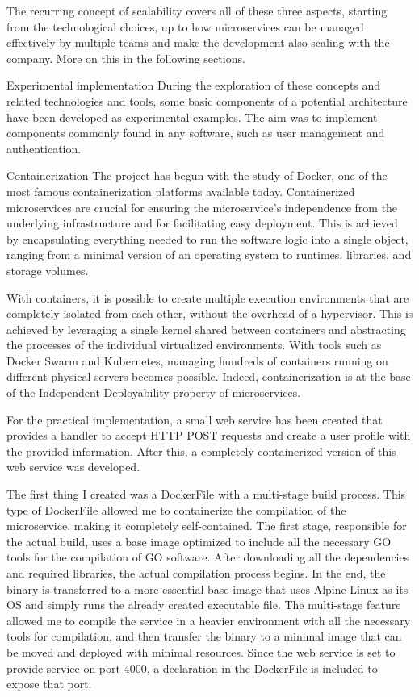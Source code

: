 \documentclass[sigplan,screen]{acmart}
\begin{document}
The recurring concept of scalability covers all of these three aspects, starting from the technological choices, up to how microservices can be managed effectively by multiple teams and make the development also scaling with the company. More on this in the following sections.

Experimental implementation
During the exploration of these concepts and related technologies and tools, some basic components of a potential architecture have been developed as experimental examples. The aim was to implement components commonly found in any software, such as user management and authentication.

Containerization
The project has begun with the study of Docker, one of the most famous containerization platforms available today. Containerized microservices are crucial for ensuring the microservice's independence from the underlying infrastructure and for facilitating easy deployment. This is achieved by encapsulating everything needed to run the software logic into a single object, ranging from a minimal version of an operating system to runtimes, libraries, and storage volumes.

With containers, it is possible to create multiple execution environments that are completely isolated from each other, without the overhead of a hypervisor. This is achieved by leveraging a single kernel shared between containers and abstracting the processes of the individual virtualized environments. With tools such as Docker Swarm and Kubernetes, managing hundreds of containers running on different physical servers becomes possible. Indeed, containerization is at the base of the Independent Deployability property of microservices.

For the practical implementation, a small web service has been created that provides a handler to accept HTTP POST requests and create a user profile with the provided information. After this, a completely containerized version of this web service was developed.

The first thing I created was a DockerFile with a multi-stage build process. This type of DockerFile allowed me to containerize the compilation of the microservice, making it completely self-contained. The first stage, responsible for the actual build, uses a base image optimized to include all the necessary GO tools for the compilation of GO software. After downloading all the dependencies and required libraries, the actual compilation process begins. In the end, the binary is transferred to a more essential base image that uses Alpine Linux as its OS and simply runs the already created executable file. The multi-stage feature allowed me to compile the service in a heavier environment with all the necessary tools for compilation, and then transfer the binary to a minimal image that can be moved and deployed with minimal resources. Since the web service is set to provide service on port 4000, a declaration in the DockerFile is included to expose that port.
\end{document}

